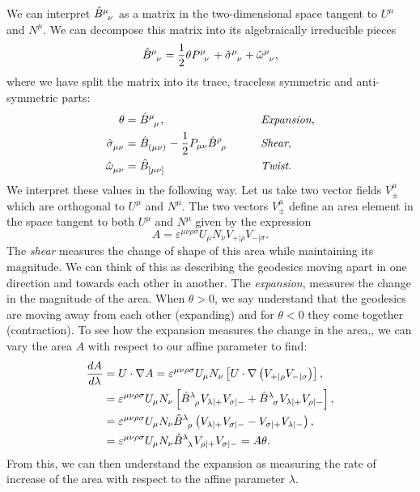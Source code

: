 We can interpret $\tensor{\hat{B}}{^\mu_\nu}$ as a matrix in the two-dimensional space tangent to $U^\mu$ and $N^\mu$. We can decompose this matrix into its algebraically irreducible pieces
\begin{equation*}
	\tensor{\hat{B}}{^\mu_\nu} = \half \theta \tensor{P}{^\mu_\nu} + \tensor{\hat{\sigma}}{^\mu_\nu} + \tensor{\hat{\omega}}{^\mu_\nu},
\end{equation*}
where we have split the matrix into its trace, traceless symmetric and anti-symmetric parts: 
\begin{equation*}
\begin{aligned}
	\theta &= \tensor{\hat{B}}{^\mu_\mu}, & &\qquad \textit{Expansion}, \\
	\tensor{\hat{\sigma}}{_{\mu\nu}} &= \tensor{\hat{B}}{_{(\mu\nu)}} - \half P_{\mu \nu} \tensor{\hat{B}}{^\rho_\rho} & &\qquad \textit{Shear}, \\
	\tensor{\hat{\omega}}{_{\mu \nu}} &= \tensor{\hat{B}}{_{[\mu\nu]}} & &\qquad \textit{Twist}.
\end{aligned}
\end{equation*}
We interpret these values in the following way. Let us take two vector fields $V_\pm^\mu$ which are orthogonal to $U^\mu$ and $N^\mu$. The two vectors $V_\pm^\mu$ define an area element in the space tangent to both $U^\mu$ and $N^\mu$ given by the expression
\begin{equation*}
		A = \varepsilon^{\mu \nu \rho \sigma} U_\mu N_\nu V_{+ |\rho} V_{- |\sigma}.
\end{equation*}
The \emph{shear} measures the change of shape of this area while maintaining its magnitude. We can think of this as describing the geodesics moving apart in one direction and towards each other in another. The \emph{expansion}, measures the change in the magnitude of the area. When $\theta > 0$, we say understand that the geodesics are moving away from each other (expanding) and for $\theta  < 0$ they come together (contraction). To see how the expansion measures the change in the area,, we can vary the area $A$ with respect to our affine parameter to find:
\begin{equation*}
\begin{aligned}
\diff{A}{\lambda} &= U \cdot \nabla A = \varepsilon^{\mu \nu \rho \sigma} U_\mu N_\nu \left[U \cdot \nabla \left(V_{+ |\rho} V_{- |\sigma} \right) \right], \\
&= \varepsilon^{\mu \nu \rho \sigma} U_\mu N_\nu \left[ \tensor{\hat{B}}{^\lambda_\rho} V_{\lambda | +} V_{\sigma | -} + \tensor{\hat{B}}{^\lambda_\sigma} V_{\lambda | +} V_{\rho | -}  \right] ,\\ 
&= \varepsilon^{\mu \nu \rho \sigma} U_\mu N_\nu \tensor{\hat{B}}{^\lambda_\rho} \left( V_{\lambda | +} V_{\sigma | -} - V_{\sigma | +} V_{\lambda | -} \right), \\ 
&= \varepsilon^{\mu \nu \rho \sigma} U_\mu N_\nu \tensor{\hat{B}}{^\lambda_\lambda} V_{\rho | +} V_{\sigma | -} = A \theta.
\end{aligned}
\end{equation*}
From this, we can then understand the expansion as measuring the rate of increase of the area with respect to the affine parameter $\lambda$.

